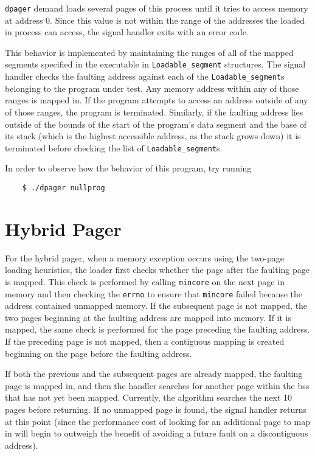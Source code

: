 \documentclass[a4paper]{article}
\begin{document}
{%

\verb|dpager| demand loads several pages of this process until it tries to access memory at address 0. Since this value is not within the range of the addresses the loaded in process can access, the signal handler exits with an error code.

This behavior is implemented by maintaining the ranges of all of the mapped segments specified in the executable in \verb|Loadable_segment| structures. The signal handler checks the faulting address against each of the \verb|Loadable_segment|s belonging to the program under test. Any memory address within any of those ranges is mapped in. If the program attempts to access an address outside of any of those ranges, the program is terminated. Similarly, if the faulting address lies outside of the bounds of the start of the program's data segment and the base of its stack (which is the highest accessible address, as the stack grows down) it is terminated before checking the list of \verb|Loadable_segment|s. 

In order to observe how the behavior of this program, try running
\begin{verbatim}
    $ ./dpager nullprog
\end{verbatim}

\section{Hybrid Pager}

For the hybrid pager, when a memory exception occurs using the two-page loading heuristics, the loader first checks whether the page after the faulting page is mapped. This check is performed by calling \verb|mincore| on the next page in memory and then checking the \verb|errno| to ensure that \verb|mincore| failed because the address contained unmapped memory. If the subsequent page is not mapped, the two pages beginning at the faulting address are mapped into memory. If it is mapped, the same check is performed for the page preceding the faulting address. If the preceding page is not mapped, then a contiguous mapping is created beginning on the page before the faulting address.

If both the previous and the subsequent pages are already mapped, the faulting page is mapped in, and then the handler searches for another page within the bss that has not yet been mapped. Currently, the algorithm searches the next 10 pages before returning. If no unmapped page is found, the signal handler returns at this point (since the performance cost of looking for an additional page to map in will begin to outweigh the benefit of avoiding a future fault on a discontiguous address). 

}
\end{document}
